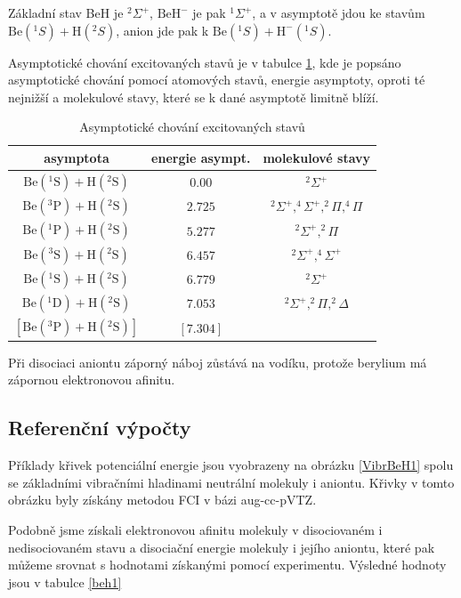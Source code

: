 Základní stav BeH je $^2\Sigma^+$, $\mathrm{BeH}^-$ je pak $^1\Sigma^+$, a v asymptotě 
jdou ke stavům $\mathrm{Be}(^1S) + \mathrm{H}(^2S)$, 
anion jde pak k $\mathrm{Be}(^1S) + \mathrm{H^-}(^1S)$.

Asymptotické chování excitovaných stavů je v tabulce \ref{taBeHas}, kde je popsáno asymptotické chování pomocí atomových stavů, energie asymptoty, oproti té nejnižší a molekulové stavy, které se k dané asymptotě limitně blíží.

\begin{table}
\centering
\caption{Asymptotické chování excitovaných stavů}
\bigskip
\label{taBeHas}
\begin{tabular}{ccc}
\toprule
asymptota & energie asympt. & molekulové stavy \\ 
\midrule
$\mathrm{Be}(^1\mathrm{S}) + \mathrm{H}(^2\mathrm{S})$ & $0.00$ & $^2\Sigma^+$ \\ 
$\mathrm{Be}(^3\mathrm{P}) + \mathrm{H}(^2\mathrm{S})$ & $2.725$ & $^2\Sigma^+,^4\Sigma^+,^2\Pi,^4\Pi$ \\
$\mathrm{Be}(^1\mathrm{P}) + \mathrm{H}(^2\mathrm{S})$ & $5.277$ & $^2\Sigma^+,^2\Pi$ \\ 
$\mathrm{Be}(^3\mathrm{S}) + \mathrm{H}(^2\mathrm{S})$ & $6.457$ & $^2\Sigma^+,^4\Sigma^+$ \\
$\mathrm{Be}(^1\mathrm{S}) + \mathrm{H}(^2\mathrm{S})$ & $6.779$ & $^2\Sigma^+$ \\
$\mathrm{Be}(^1\mathrm{D}) + \mathrm{H}(^2\mathrm{S})$ & $7.053$ & $^2\Sigma^+,^2\Pi,^2\Delta$ \\
$\left[\mathrm{Be}(^3\mathrm{P}) + \mathrm{H}(^2\mathrm{S})\right]$ &$[7.304]$& \\
\bottomrule
\end{tabular}
\end{table}

Při disociaci aniontu záporný náboj zůstává na vodíku, protože berylium má 
zápornou elektronovou afinitu.

\subsection{Referenční výpočty}
 Příklady křivek potenciální energie jsou vyobrazeny na obrázku  
\ref{VibrBeH1} spolu se základními vibračními hladinami neutrální molekuly i aniontu.
Křivky v tomto obrázku byly získány metodou FCI v bázi aug-cc-pVTZ.

Podobně jsme  získali elektronovou afinitu molekuly v disociovaném i nedisociovaném 
stavu a disociační energie molekuly i jejího aniontu, které pak můžeme srovnat s 
hodnotami získanými pomocí experimentu. Výsledné hodnoty jsou v tabulce \ref{beh1}

